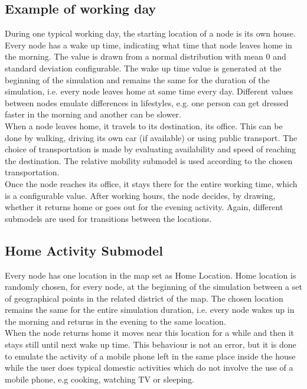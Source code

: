 \subsection{Example of working day}
During one typical working day, the starting location of a node is its own house. Every node has a wake up time, indicating what time that node leaves home in the morning. The value is drawn from a normal distribution with mean 0 and standard deviation configurable. The wake up time value is generated at the beginning of the simulation and remains the same for the duration of the simulation, i.e. every node leaves home at same time every day. Different values between nodes emulate differences in lifestyles, e.g. one person can get dressed faster in the morning and another can be slower.
\\ 

When a node leaves home, it travels to its destination, its office. This can be done by walking, driving its own car (if available) or using public transport. The choice of transportation is made by evaluating availability and speed of reaching the destination. The relative mobility submodel is used according to the chosen transportation.
\\

Once the node reaches its office, it stays there for the entire working time, which is a configurable value. After working hours, the node decides, by drawing, whether it returns home or goes out for the evening activity. Again, different submodels are used for transitions between the locations.


\subsection{Home Activity Submodel}
Every node has one location in the map set as Home Location. Home location is randomly chosen, for every node, at the beginning of the simulation between a set of geographical points in the related district of the map. The chosen location remains the same for the entire simulation duration, i.e. every node wakes up in the morning and returns in the evening to the same location.
\\

When the node returns home it moves near this location for a while and then it stays still until next wake up time. This behaviour is not an error, but it is done to emulate the activity of a mobile phone left in the same place inside the house while the user does typical domestic activities which do not involve the use of a mobile phone, e.g cooking, watching TV or sleeping.

